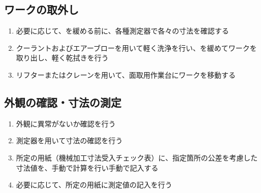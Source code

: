 \subsection{ワークの取外し}
\begin{enumerate}[label=\sarrow]
\item 必要に応じて、\FixtureBolt を緩める前に、各種測定器で各々の寸法を確認する
\item {}クーラントおよびエアーブローを用いて軽く洗浄を行い、\FixtureBolt を緩めてワークを取り出し、軽く乾拭きを行う
\item {}リフターまたはクレーンを用いて、面取用作業台にワークを移動する
\end{enumerate}


\subsection{外観の確認・寸法の測定}
\begin{enumerate}[label=\sarrow]
\item {}外観に異常がないか確認を行う
\item {}測定器を用いて寸法の確認を行う
\item 所定の用紙（機械加工寸法受入チェック表）に、指定箇所の公差を考慮した寸法値を、手動で計算を行い手動で記入する
\item 必要に応じて、所定の用紙に測定値の記入を行う
\end{enumerate}


